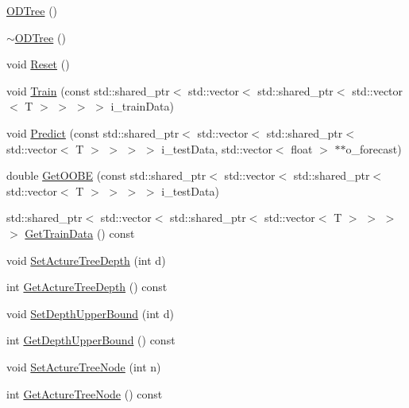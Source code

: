 \begin{DoxyCompactItemize}
\item 
\hyperlink{class_random_forest_1_1_o_d_tree_aa1b1238053093f3167718d3b9042fe99}{O\+D\+Tree} ()
\item 
\hyperlink{class_random_forest_1_1_o_d_tree_ae87551a7152dd152f4e63c0462952779}{$\sim$\+O\+D\+Tree} ()
\item 
void \hyperlink{class_random_forest_1_1_o_d_tree_a506533e80445366adddc6f780ad7a393}{Reset} ()
\item 
void \hyperlink{class_random_forest_1_1_o_d_tree_ae446c1682a1bacb4692e2456dab9c5b6}{Train} (const std\+::shared\+\_\+ptr$<$ std\+::vector$<$ std\+::shared\+\_\+ptr$<$ std\+::vector$<$ T $>$ $>$ $>$ $>$ i\+\_\+train\+Data)
\item 
void \hyperlink{class_random_forest_1_1_o_d_tree_a804212395cde8451356f2a6fa591a021}{Predict} (const std\+::shared\+\_\+ptr$<$ std\+::vector$<$ std\+::shared\+\_\+ptr$<$ std\+::vector$<$ T $>$ $>$ $>$ $>$ i\+\_\+test\+Data, std\+::vector$<$ float $>$ $\ast$$\ast$o\+\_\+forecast)
\item 
double \hyperlink{class_random_forest_1_1_o_d_tree_a79674602936722bc2e83287de381bd05}{Get\+O\+O\+BE} (const std\+::shared\+\_\+ptr$<$ std\+::vector$<$ std\+::shared\+\_\+ptr$<$ std\+::vector$<$ T $>$ $>$ $>$ $>$ i\+\_\+test\+Data)
\item 
std\+::shared\+\_\+ptr$<$ std\+::vector$<$ std\+::shared\+\_\+ptr$<$ std\+::vector$<$ T $>$ $>$ $>$ $>$ \hyperlink{class_random_forest_1_1_o_d_tree_a1f08c1912f039c6ea6f683e0076a1b14}{Get\+Train\+Data} () const 
\item 
void \hyperlink{class_random_forest_1_1_o_d_tree_a8a3254456b1eef0c3fbab25790a2b68c}{Set\+Acture\+Tree\+Depth} (int d)
\item 
int \hyperlink{class_random_forest_1_1_o_d_tree_ade4a56099fe6a786a205d2773b92883d}{Get\+Acture\+Tree\+Depth} () const 
\item 
void \hyperlink{class_random_forest_1_1_o_d_tree_ae0d1d39e74a0af671cf30f953fd8888a}{Set\+Depth\+Upper\+Bound} (int d)
\item 
int \hyperlink{class_random_forest_1_1_o_d_tree_a6a7cdbeea48888cbeec50b1e331894dc}{Get\+Depth\+Upper\+Bound} () const 
\item 
void \hyperlink{class_random_forest_1_1_o_d_tree_a3640dbbc40413d0e24f6e6bb22ea9d6e}{Set\+Acture\+Tree\+Node} (int n)
\item 
int \hyperlink{class_random_forest_1_1_o_d_tree_a4c84703475c79bbb5fa3dae7f311902d}{Get\+Acture\+Tree\+Node} () const 
$$
\end{DoxyCompactItemize}
